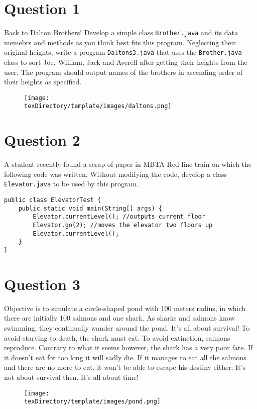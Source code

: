 \documentclass[12pt,letterpaper,twoside]{article}
\begin{document}


\section*{Question 1}

Back to Dalton Brothers! Develop a simple class \texttt{Brother.java} and its data memebrs and methods as you think best fits this program. Neglecting their original heights, write a program \texttt{Daltons3.java} that uses the \texttt{Brother.java} class to sort Joe, William, Jack and Averell after getting their heights from the user. The program should output names of the brothers in ascending order of their heights as specified.

\begin{figure}[H]\centering
\texttt{[image: \\texDirectory/template/images/daltons.png]}
\end{figure}

\section*{Question 2}

A student recently found a scrap of paper in MBTA Red line train on which the following code was written. Without modifying the code, develop a class \texttt{Elevator.java} to be used by this program.
\lstset{language=java}
\begin{lstlisting}
public class ElevatorTest {
	public static void main(String[] args) {
		Elevator.currentLevel(); //outputs current floor
		Elevator.go(2); //moves the elevator two floors up
		Elevator.currentLevel();
	}
}
\end{lstlisting}

\section*{Question 3}

Objective is to simulate a circle-shaped pond with 100 meters radius, in which there are initially 100 salmons and one shark. As sharks and salmons know swimming, they continually wander around the pond. It's all about survival! To avoid starving to death, the shark must eat. To avoid extinction, salmons reproduce. Contrary to what it seems however, the shark has a very poor fate. If it doesn't eat for too long it will sadly die. If it manages to eat all the salmons and there are no more to eat, it won't be able to escape his destiny either. It's not about survival then. It's all about time!
\begin{figure}[H]\centering
\texttt{[image: \\texDirectory/template/images/pond.png]}
\end{figure}
\end{document}
